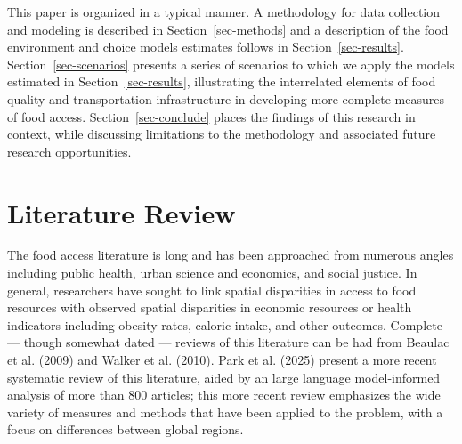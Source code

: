 \documentclass[
  letterpaper,
  number,
  review,
  3p]{elsarticle}
\begin{document}
This paper is organized in a typical manner. A methodology for data
collection and modeling is described in Section~\ref{sec-methods} and a
description of the food environment and choice models estimates follows
in Section~\ref{sec-results}. Section~\ref{sec-scenarios} presents a
series of scenarios to which we apply the models estimated in
Section~\ref{sec-results}, illustrating the interrelated elements of
food quality and transportation infrastructure in developing more
complete measures of food access. Section~\ref{sec-conclude} places the
findings of this research in context, while discussing limitations to
the methodology and associated future research opportunities.


\section{Literature Review}\label{sec-literature}

The food access literature is long and has been approached from numerous
angles including public health, urban science and economics, and social
justice. In general, researchers have sought to link spatial disparities
in access to food resources with observed spatial disparities in
economic resources or health indicators including obesity rates, caloric
intake, and other outcomes. Complete --- though somewhat dated ---
reviews of this literature can be had from Beaulac et al. (2009) and
Walker et al. (2010). Park et al. (2025) present a more recent
systematic review of this literature, aided by an large language
model-informed analysis of more than 800 articles; this more recent
review emphasizes the wide variety of measures and methods that have
been applied to the problem, with a focus on differences between global
regions.
\end{document}
